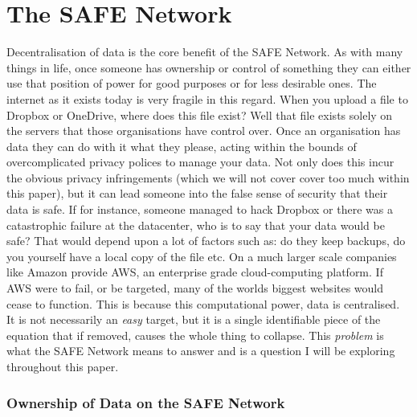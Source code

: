 \chapter{The SAFE Network}
\label{ch:thesafenetwork}

Decentralisation of data is the core benefit of the SAFE Network. As with many things in life, once someone has ownership or control of something they can either use that position of power for good purposes or for less desirable ones. The internet as it exists today is very fragile in this regard. When you upload a file to Dropbox\cite{dropbox} or OneDrive\cite{onedrive}, where does this file exist? Well that file exists solely on the servers that those organisations have control over. Once an organisation has data they can do with it what they please, acting within the bounds of overcomplicated privacy polices to manage your data. Not only does this incur the obvious privacy infringements (which we will not cover cover too much within this paper), but it can lead someone into the false sense of security that their data is safe. If for instance, someone managed to hack Dropbox or there was a catastrophic failure at the datacenter, who is to say that your data would be safe? That would depend upon a lot of factors such as: do they keep backups, do you yourself have a local copy of the file etc. On a much larger scale companies like Amazon provide AWS\cite{amazon-aws}, an enterprise grade cloud-computing platform. If AWS were to fail, or be targeted, many of the worlds biggest websites would cease to function. This is because this computational power, data is centralised. It is not necessarily an \textit{easy} target, but it is a single identifiable piece of the equation that if removed, causes the whole thing to collapse. This \textit{problem} is what the SAFE Network means to answer and is a question I will be exploring throughout this paper.

\subsection{Ownership of Data on the SAFE Network}

